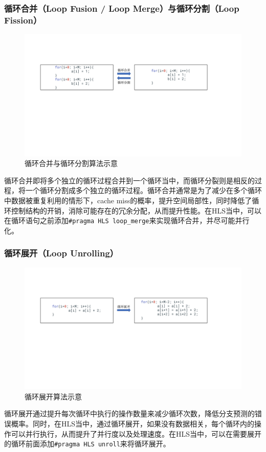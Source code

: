 \subsubsection{循环合并（Loop Fusion / Loop Merge）与循环分割（Loop Fission）}
\begin{figure}[htbp]
    \centering
    \includegraphics[width=\linewidth]{figures/loop fusion.pdf}
    \caption{循环合并与循环分割算法示意}
    \label{fig:loop_fusion}
\end{figure}
循环合并即将多个独立的循环过程合并到一个循环当中，而循环分裂则是相反的过程，将一个循环分割成多个独立的循环过程。循环合并通常是为了减少在多个循环中数据被重复利用的情形下，cache miss的概率，提升空间局部性，同时降低了循环控制结构的开销，消除可能存在的冗余分配，从而提升性能。在HLS当中，可以在循环语句之前添加\verb|#pragma HLS loop_merge|来实现循环合并，并尽可能并行化。
\subsubsection{循环展开（Loop Unrolling）}
\begin{figure}[htbp]
    \centering
    \includegraphics[width=\linewidth]{figures/loop unrolling.pdf}
    \caption{循环展开算法示意}
    \label{fig:loop_unrolling}
\end{figure}
循环展开通过提升每次循环中执行的操作数量来减少循环次数，降低分支预测的错误概率。同时，在HLS当中，通过循环展开，如果没有数据相关，每个循环内的操作可以并行执行，从而提升了并行度以及处理速度。在HLS当中，可以在需要展开的循环前面添加\verb|#pragma HLS unroll|来将循环展开。

